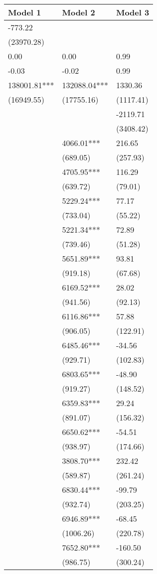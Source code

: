 \begin{tabular}{lll}
\toprule
Model 1 & Model 2 & Model 3 \\
\midrule
-773.22 &  &  \\
(23970.28) &  &  \\
0.00 & 0.00 & 0.99 \\
-0.03 & -0.02 & 0.99 \\
138001.81*** & 132088.04*** & 1330.36 \\
(16949.55) & (17755.16) & (1117.41) \\
 &  & -2119.71 \\
 &  & (3408.42) \\
 & 4066.01*** & 216.65 \\
 & (689.05) & (257.93) \\
 & 4705.95*** & 116.29 \\
 & (639.72) & (79.01) \\
 & 5229.24*** & 77.17 \\
 & (733.04) & (55.22) \\
 & 5221.34*** & 72.89 \\
 & (739.46) & (51.28) \\
 & 5651.89*** & 93.81 \\
 & (919.18) & (67.68) \\
 & 6169.52*** & 28.02 \\
 & (941.56) & (92.13) \\
 & 6116.86*** & 57.88 \\
 & (906.05) & (122.91) \\
 & 6485.46*** & -34.56 \\
 & (929.71) & (102.83) \\
 & 6803.65*** & -48.90 \\
 & (919.27) & (148.52) \\
 & 6359.83*** & 29.24 \\
 & (891.07) & (156.32) \\
 & 6650.62*** & -54.51 \\
 & (938.97) & (174.66) \\
 & 3808.70*** & 232.42 \\
 & (589.87) & (261.24) \\
 & 6830.44*** & -99.79 \\
 & (932.74) & (203.25) \\
 & 6946.89*** & -68.45 \\
 & (1006.26) & (220.78) \\
 & 7652.80*** & -160.50 \\
 & (986.75) & (300.24) \\

\end{tabular}
